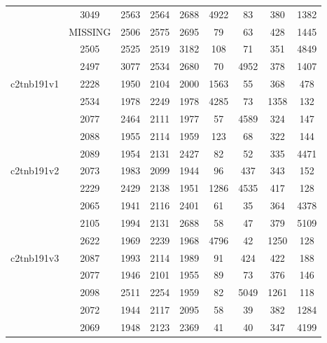 \documentclass[a4paper, 8pt, envcountsect, runningheads]{article}
\begin{document}
\begin{center}
\begin{longtable}{ |l|c|c|c|c|c|c|c|c| }
	 & 3049 & 2563 & 2564 & 2688 & 4922 & 83 & 380 & 1382 \\
	 	 
	 & MISSING & 2506 & 2575 & 2695 & 79 & 63 & 428 & 1445 \\
	 
	 & 2505 & 2525 & 2519 & 3182 & 108 & 71 & 351 & 4849 \\
	 
	 & 2497 & 3077 & 2534 & 2680 & 70 & 4952 & 378 & 1407 \\ \hline
	 	 
	 c2tnb191v1 & 2228 & 1950 & 2104 & 2000 & 1563 & 55 & 368 & 478 \\
	 
	 & 2534 & 1978 & 2249 & 1978 & 4285 & 73 & 1358 & 132 \\
	 	 
	 & 2077 & 2464 & 2111 & 1977 & 57 & 4589 & 324 & 147 \\
	 
	 & 2088 & 1955 & 2114 & 1959 & 123 & 68 & 322 & 144 \\
	 
	 & 2089 & 1954 & 2131 & 2427 & 82 & 52 & 335 & 4471 \\ \hline
	 	 
	 c2tnb191v2 & 2073 & 1983 & 2099 & 1944 & 96 & 437 & 343 & 152 \\
	 
	 & 2229 & 2429 & 2138 & 1951 & 1286 & 4535 & 417 & 128 \\
	 	 
	 & 2065 & 1941 & 2116 & 2401 & 61 & 35 & 364 & 4378 \\
	 
	 & 2105 & 1994 & 2131 & 2688 & 58 & 47 & 379 & 5109 \\
	 
	 & 2622 & 1969 & 2239 & 1968 & 4796 & 42 & 1250 & 128 \\ \hline
	 
	 c2tnb191v3 & 2087 & 1993 & 2114 & 1989 & 91 & 424 & 422 & 188 \\
	 
	 & 2077 & 1946 & 2101 & 1955 & 89 & 73 & 376 & 146 \\
	 	 
	 & 2098 & 2511 & 2254 & 1959 & 82 & 5049 & 1261 & 118 \\
	 
	 & 2072 & 1944 & 2117 & 2095 & 58 & 39 & 382 & 1284 \\
	 
	 & 2069 & 1948 & 2123 & 2369 & 41 & 40 & 347 & 4199 \\ \hline
	 

\end{longtable}
\end{center}
\end{document}

